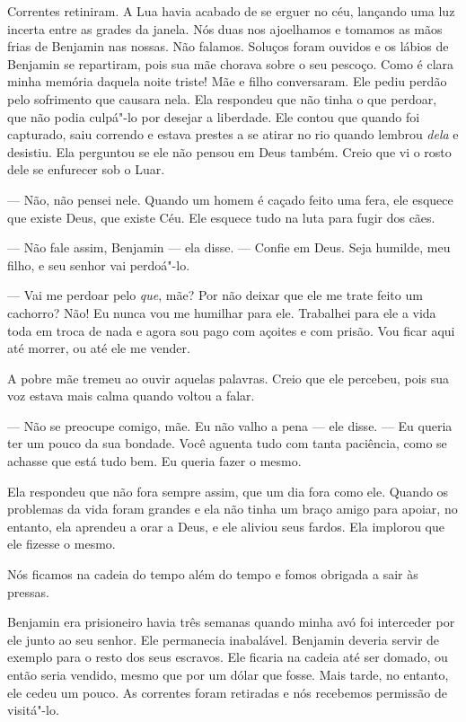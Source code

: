Correntes retiniram. A Lua havia acabado de se erguer no céu, lançando
uma luz incerta entre as grades da janela. Nós duas nos ajoelhamos e
tomamos as mãos frias de Benjamin nas nossas. Não falamos. Soluços foram
ouvidos e os lábios de Benjamin se repartiram, pois sua mãe chorava
sobre o seu pescoço. Como é clara minha memória daquela noite triste!
Mãe e filho conversaram. Ele pediu perdão pelo sofrimento que causara
nela. Ela respondeu que não tinha o que perdoar, que não podia culpá"-lo
por desejar a liberdade. Ele contou que quando foi capturado, saiu
correndo e estava prestes a se atirar no rio quando lembrou \emph{dela}
e desistiu. Ela perguntou se ele não pensou em Deus também. Creio que vi
o rosto dele se enfurecer sob o Luar.

--- Não, não pensei nele. Quando um homem é caçado feito uma fera, ele
esquece que existe Deus, que existe Céu. Ele esquece tudo na luta para
fugir dos cães.

--- Não fale assim, Benjamin --- ela
disse. --- Confie em Deus. Seja humilde, meu filho, e seu senhor vai
perdoá"-lo.

--- Vai me perdoar pelo \emph{que},
mãe? Por não deixar que ele me trate feito um cachorro? Não! Eu nunca
vou me humilhar para ele. Trabalhei para ele a vida toda em troca de
nada e agora sou pago com açoites e com prisão. Vou ficar aqui até
morrer, ou até ele me vender.

A pobre mãe tremeu ao ouvir aquelas
palavras. Creio que ele percebeu, pois sua voz estava mais calma quando
voltou a falar.

--- Não se preocupe comigo, mãe. Eu não valho a pena --- ele disse. ---
Eu queria ter um pouco da sua bondade. Você aguenta tudo com tanta
paciência, como se achasse que está tudo bem. Eu queria fazer o mesmo.

Ela respondeu que não fora sempre
assim, que um dia fora como ele. Quando os problemas da vida foram
grandes e ela não tinha um braço amigo para apoiar, no entanto, ela
aprendeu a orar a Deus, e ele aliviou seus fardos. Ela implorou que ele
fizesse o mesmo.

Nós ficamos na cadeia do tempo além do
tempo e fomos obrigada a sair às pressas.

Benjamin era prisioneiro havia três
semanas quando minha avó foi interceder por ele junto ao seu senhor. Ele
permanecia inabalável. Benjamin deveria servir de exemplo para o resto
dos seus escravos. Ele ficaria na cadeia até ser domado, ou então seria
vendido, mesmo que por um dólar que fosse. Mais tarde, no entanto, ele
cedeu um pouco. As correntes foram retiradas e nós recebemos permissão
de visitá"-lo.

